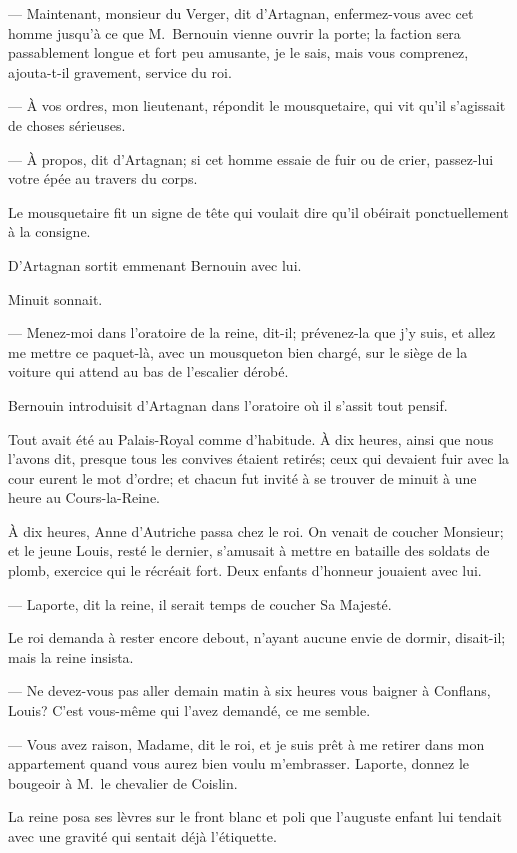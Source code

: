 — Maintenant, monsieur du Verger, dit d'Artagnan, enfermez-vous avec cet homme jusqu'à ce que M.~Bernouin vienne ouvrir la porte; la faction sera passablement longue et fort peu amusante, je le sais, mais vous comprenez, ajouta-t-il gravement, service du roi.

— À vos ordres, mon lieutenant, répondit le mousquetaire, qui vit qu'il s'agissait de choses sérieuses.

— À propos, dit d'Artagnan; si cet homme essaie de fuir ou de crier, passez-lui votre épée au travers du corps.

Le mousquetaire fit un signe de tête qui voulait dire qu'il obéirait ponctuellement à la consigne.

D'Artagnan sortit emmenant Bernouin avec lui.

Minuit sonnait.

— Menez-moi dans l'oratoire de la reine, dit-il; prévenez-la que j'y suis, et allez me mettre ce paquet-là, avec un mousqueton bien chargé, sur le siège de la voiture qui attend au bas de l'escalier dérobé.

Bernouin introduisit d'Artagnan dans l'oratoire où il s'assit tout pensif.

Tout avait été au Palais-Royal comme d'habitude. À dix heures, ainsi que nous l'avons dit, presque tous les convives étaient retirés; ceux qui devaient fuir avec la cour eurent le mot d'ordre; et chacun fut invité à se trouver de minuit à une heure au Cours-la-Reine.

À dix heures, Anne d'Autriche passa chez le roi. On venait de coucher Monsieur; et le jeune Louis, resté le dernier, s'amusait à mettre en bataille des soldats de plomb, exercice qui le récréait fort. Deux enfants d'honneur jouaient avec lui.

— Laporte, dit la reine, il serait temps de coucher Sa Majesté.

Le roi demanda à rester encore debout, n'ayant aucune envie de dormir, disait-il; mais la reine insista.

— Ne devez-vous pas aller demain matin à six heures vous baigner à Conflans, Louis? C'est vous-même qui l'avez demandé, ce me semble.

— Vous avez raison, Madame, dit le roi, et je suis prêt à me retirer dans mon appartement quand vous aurez bien voulu m'embrasser. Laporte, donnez le bougeoir à M.~le chevalier de Coislin.

La reine posa ses lèvres sur le front blanc et poli que l'auguste enfant lui tendait avec une gravité qui sentait déjà l'étiquette.

